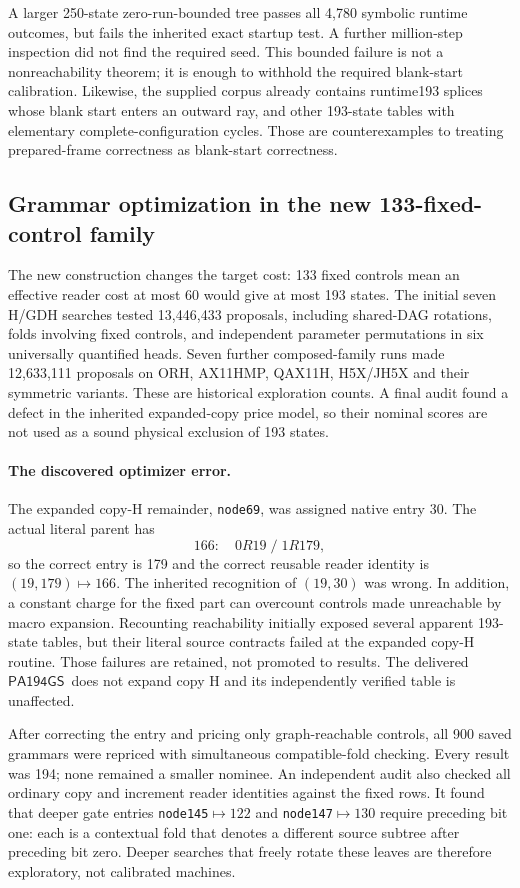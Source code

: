 \documentclass[10pt,a4paper]{article}
\newcommand{\GS}{\ensuremath{\mathsf{PA194GS}}}
\theoremstyle{definition}
\begin{document}
A larger 250-state zero-run-bounded tree passes all 4,780 symbolic
runtime outcomes, but fails the inherited exact startup test. A further
million-step inspection did not find the required seed. This bounded
failure is not a nonreachability theorem; it is enough to withhold the
required blank-start calibration. Likewise, the supplied corpus already
contains runtime193 splices whose blank start enters an outward ray, and
other 193-state tables with elementary complete-configuration cycles.
Those are counterexamples to treating prepared-frame correctness as
blank-start correctness.

\subsection{Grammar optimization in the new 133-fixed-control family}

The new construction changes the target cost: 133 fixed controls mean an
effective reader cost at most 60 would give at most 193 states. The
initial seven H/GDH searches tested 13,446,433 proposals, including
shared-DAG rotations, folds involving fixed controls, and independent
parameter permutations in six universally quantified heads. Seven further
composed-family runs made 12,633,111 proposals on ORH, AX11HMP, QAX11H,
H5X/JH5X and their symmetric variants. These are historical exploration
counts. A final audit found a defect in the inherited expanded-copy price
model, so their nominal scores are not used as a sound physical exclusion
of 193 states.

\paragraph{The discovered optimizer error.}
The expanded copy-H remainder, \texttt{node69}, was assigned native
entry 30. The actual literal parent has
\[
       166:\quad 0R19\;/\;1R179,
\]
so the correct entry is 179 and the correct reusable reader identity is
$(19,179)\mapsto166$. The inherited recognition of $(19,30)$ was wrong.
In addition, a constant charge for the fixed part can overcount controls
made unreachable by macro expansion. Recounting reachability initially
exposed several apparent 193-state tables, but their literal source
contracts failed at the expanded copy-H routine. Those failures are
retained, not promoted to results. The delivered \GS\ does not expand
copy H and its independently verified table is unaffected.

After correcting the entry and pricing only graph-reachable controls,
all 900 saved grammars were repriced with simultaneous compatible-fold
checking. Every result was 194; none remained a smaller nominee. An
independent audit also checked all ordinary copy and increment reader
identities against the fixed rows. It found that deeper gate entries
\texttt{node145}$\mapsto122$ and \texttt{node147}$\mapsto130$ require
preceding bit one: each is a contextual fold that denotes a different
source subtree after preceding bit zero. Deeper searches that freely
rotate these leaves are therefore exploratory, not calibrated machines.
\end{document}
